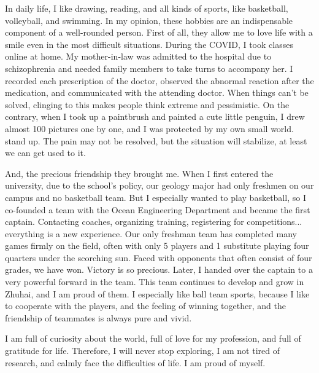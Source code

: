\documentclass{article}
\numberwithin{equation}{section}
\begin{document}
In daily life, I like drawing, reading, and all kinds of sports, like basketball, volleyball, and swimming. In my opinion, these hobbies are an indispensable component of a well-rounded person. First of all, they allow me to love life with a smile even in the most difficult situations. During the COVID, I took classes online at home. My mother-in-law was admitted to the hospital due to schizophrenia and needed family members to take turns to accompany her. I recorded each prescription of the doctor, observed the abnormal reaction after the medication, and communicated with the attending doctor. When things can’t be solved, clinging to this makes people think extreme and pessimistic. On the contrary, when I took up a paintbrush and painted a cute little penguin, I drew almost 100 pictures one by one, and I was protected by my own small world. stand up. The pain may not be resolved, but the situation will stabilize, at least we can get used to it.

And, the precious friendship they brought me. When I first entered the university, due to the school’s policy, our geology major had only freshmen on our campus and no basketball team. But I especially wanted to play basketball, so I co-founded a team with the Ocean Engineering Department and became the first captain. Contacting coaches, organizing training, registering for competitions... everything is a new experience. Our only freshman team has completed many games firmly on the field, often with only 5 players and 1 substitute playing four quarters under the scorching sun. Faced with opponents that often consist of four grades, we have won. Victory is so precious. Later, I handed over the captain to a very powerful forward in the team. This team continues to develop and grow in Zhuhai, and I am proud of them. I especially like ball team sports, because I like to cooperate with the players, and the feeling of winning together, and the friendship of teammates is always pure and vivid.

I am full of curiosity about the world, full of love for my profession, and full of gratitude for life. Therefore, I will never stop exploring, I am not tired of research, and calmly face the difficulties of life. I am proud of myself.
\end{document}
